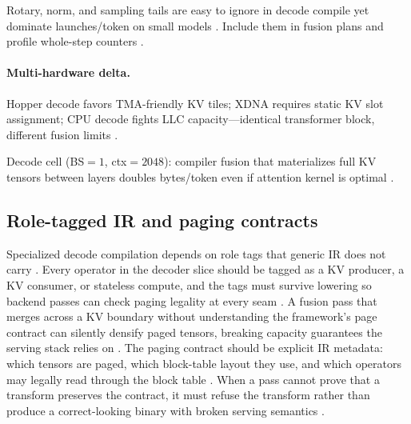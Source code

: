 Rotary, norm, and sampling tails are easy to ignore in decode compile yet dominate launches/token on small models \citep{taxbreak2026,patel2025llminference,kwon2023vllm,yirage2026,chen2020compilerbasedhardw,memoryfloor2026,liu2024deepseekv3,amd2024aie,dlbook,dao2022flashattention,dao2023flashdecoding,nvidia2024cudagraphs,nvidia2022hopper,semianalysis2024tma,amd2024xdna}. Include them in fusion plans and profile whole-step counters \citep{taxbreak2026,memoryfloor2026,patel2025llminference,yirage2026,chen2020compilerbasedhardw,kwon2023vllm,liu2024deepseekv3,amd2024aie,dlbook,dao2022flashattention,dao2023flashdecoding,nvidia2024cudagraphs,nvidia2022hopper,semianalysis2024tma,amd2024xdna}.

\paragraph{Multi-hardware delta.} Hopper decode favors TMA-friendly KV tiles; XDNA requires static KV slot assignment; CPU decode fights LLC capacity---identical transformer block, different fusion limits \citep{semianalysis2024tma,amd2024xdna,amd2024aie,dlbook,chen2020compilerbasedhardw,yirage2026,patel2025llminference,kwon2023vllm,liu2024deepseekv3,memoryfloor2026,taxbreak2026,dao2022flashattention,dao2023flashdecoding,nvidia2024cudagraphs,nvidia2022hopper}.

\begin{example}
Decode cell (BS${=}1$, ctx${=}2048$): compiler fusion that materializes full KV tensors between layers doubles bytes/token even if attention kernel is optimal \citep{memoryfloor2026,dao2022flashattention,kwon2023vllm,yirage2026,chen2020compilerbasedhardw,patel2025llminference,taxbreak2026,liu2024deepseekv3,amd2024aie,dlbook,dao2023flashdecoding,nvidia2024cudagraphs,nvidia2022hopper,semianalysis2024tma,amd2024xdna}.
\end{example}

\subsection{Role-tagged IR and paging contracts}

Specialized decode compilation depends on role tags that generic IR does not carry \citep{patel2025llminference,chen2020compilerbasedhardw,yirage2026}. Every operator in the decoder slice should be tagged as a KV producer, a KV consumer, or stateless compute, and the tags must survive lowering so backend passes can check paging legality at every seam \citep{dao2022flashattention,kwon2023vllm,memoryfloor2026}. A fusion pass that merges across a KV boundary without understanding the framework's page contract can silently densify paged tensors, breaking capacity guarantees the serving stack relies on \citep{kwon2023vllm,patel2025llminference,memoryfloor2026}. The paging contract should be explicit IR metadata: which tensors are paged, which block-table layout they use, and which operators may legally read through the block table \citep{chen2020compilerbasedhardw,yirage2026}. When a pass cannot prove that a transform preserves the contract, it must refuse the transform rather than produce a correct-looking binary with broken serving semantics \citep{memoryfloor2026,patel2025llminference}.

